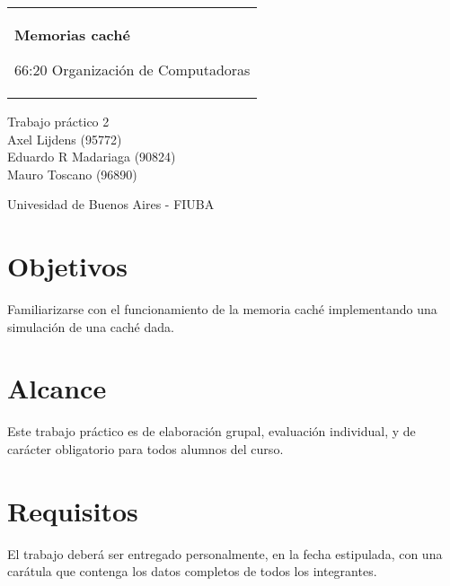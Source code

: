 \documentclass[11pt,a4paper, spanish]{article}
\begin{document}

\begin{titlepage}
  \noindent%
  \begin{tabular}{@{}p{\textwidth}@{}}
    \vspace{0.2cm}
    \begin{center}
    \Huge{\textbf{
      Memorias caché
    }}
    \end{center}
    \begin{center}
      \Large{
         66:20 Organizaci\'on de Computadoras
      }
    \end{center}
    \vspace{0.2cm}\\
  \end{tabular}
  \vspace{4 cm}
  \begin{center}
    {\large
      Trabajo práctico 2
    }\\
    \vspace{0.6cm}
    {\Large
      Axel Lijdens (95772)\\
      Eduardo R Madariaga (90824)\\
      Mauro Toscano (96890)
    }
  \end{center}
  \vfill
  \begin{center}
  Univesidad de Buenos Aires - FIUBA
  \end{center}
\end{titlepage}


\tableofcontents
\pagebreak

\section{Objetivos}

Familiarizarse con el funcionamiento de la memoria caché implementando una simulación de una caché dada.

\section{Alcance}

Este trabajo práctico es de elaboración grupal, evaluación individual, y de carácter obligatorio para todos alumnos del curso.

\section{Requisitos}

El trabajo deberá ser entregado personalmente, en la fecha estipulada, con una carátula que contenga los datos completos de todos los integrantes.
\end{document}
